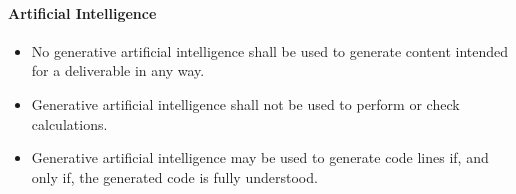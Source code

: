 \paragraph{Artificial Intelligence}
\begin{itemize}
    \item No generative artificial intelligence shall be used to generate content intended for a deliverable in any way.
    \item Generative artificial intelligence shall not be used to perform or check calculations.
    \item Generative artificial intelligence may be used to generate code lines if, and only if, the generated code is fully understood.
\end{itemize}